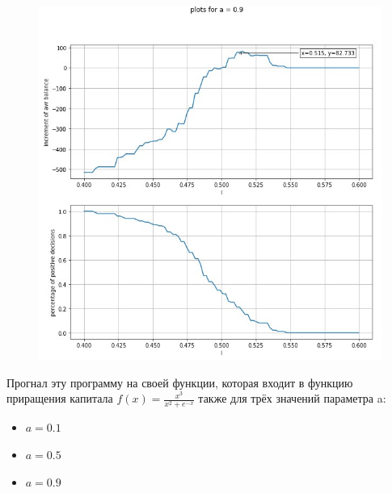 \documentclass{article}
\begin{document}
\begin{figure}[H]
\begin{minipage}[h]{0.49\linewidth}
		\end{minipage}
		\hfill
		\begin{minipage}[h]{0.49\linewidth}
			\includegraphics[width=1.0\linewidth]{assets/plot_a09.jpg}
		\end{minipage}
	\end{figure}
Прогнал эту программу на своей функции, которая входит в функцию приращения капитала $f(x) = \frac{x^3}{x^2 + e^{-x}}$ также для трёх значений параметра a:
\begin{itemize}
	\item $a = 0.1$
	\item $a = 0.5$
	\item $a = 0.9$ 
\end{itemize}
\end{document}
